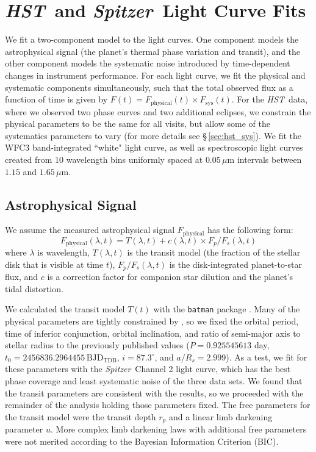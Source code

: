 \documentclass[twocolumn]{aastex61}
\newcommand{\project}[1]{\textsl{#1}}
\newcommand{\HST}{\project{HST}}
\newcommand{\Spitzer}{\project{Spitzer}}
\begin{document}
\section{\HST\ and \Spitzer\ Light Curve Fits}
\label{sec:fits}
We fit a two-component model to the light curves. One component models the astrophysical signal (the planet's thermal phase variation and transit), and the other component models the systematic noise introduced by time-dependent changes in instrument performance. For each light curve, we fit the physical and systematic components simultaneously, such that the total observed flux as a function of time is given by $F(t) = F_\mathrm{physical}(t) \times F_\mathrm{sys}(t)$. For the \HST\ data, where we observed two phase curves and two additional eclipses, we constrain the physical parameters to be the same for all visits, but allow some of the systematics parameters to vary (for more details see \S\,\ref{sec:hst_sys}). We fit the WFC3 band-integrated ``white" light curve, as well as spectroscopic light curves created from 10 wavelength bins uniformly spaced at $0.05\,\mu$m intervals between $1.15$ and $1.65\,\mu$m.

\subsection{Astrophysical Signal}
We assume the measured astrophysical signal $F_\mathrm{physical}$ has the following form:
\begin{equation}
	F_\mathrm{physical}(\lambda, t) =  T(\lambda, t) + c(\lambda, t) \times F_p/F_s(\lambda, t)
\end{equation}
where $\lambda$ is wavelength, $T(\lambda, t)$ is the transit model (the fraction of the stellar disk that is visible at time $t$), $F_p/F_s(\lambda, t)$ is the disk-integrated planet-to-star flux, and $c$ is a correction factor for companion star dilution and the planet's tidal distortion. 

We calculated the transit model $T(t)$ with the \texttt{batman} package \citep{kreidberg15a}. Many of the physical parameters are tightly constrained by \cite{southworth15}, so we fixed the orbital period, time of inferior conjunction, orbital inclination, and ratio of semi-major axis to stellar radius to the previously published values ($P = 0.925545613$ day, $t_0 = 2456836.2964455\,\mathrm{BJD_{TDB}}$, $i = 87.3^\circ$, and $a/R_s = 2.999$). As a test, we fit for these parameters with the \Spitzer\ Channel 2 light curve, which has the best phase coverage and least systematic noise of the three data sets. We found that the transit parameters are consistent with the \cite{southworth15} results, so we proceeded with the remainder of the analysis holding those parameters fixed.  The free parameters for the transit model were the transit depth $r_p$ and a linear limb darkening parameter $u$. More complex limb darkening laws with additional free parameters were not merited according to the Bayesian Information Criterion (BIC).
\end{document}
